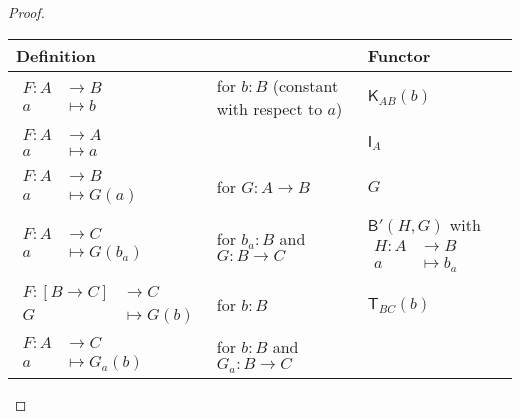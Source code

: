 \documentclass[a4paper]{article}
\theoremstyle{definition}
\theoremstyle{remark}
\newcommand{\nm}{\mathsf}
\newcommand{\combinator}{\nm}
\newcommand{\idFun}{\combinator{I}}
\newcommand{\revAppFun}{\combinator{T}}
\newcommand{\constFun}{\combinator{K}}
\newcommand{\compFun}{\combinator{B'}}
\begin{document}
\begin{proof}
  \begin{table}
    \centering
    \begin{tabular}{ll|l}
      Definition & & Functor\\
      \hline\hline
      \rule{0pt}{2em}
      $\begin{aligned}
        F : A &\to     B\\
            a &\mapsto b
      \end{aligned}$ &
      \parbox{3cm}{for $b : B$ (constant \\ with respect to $a$)} &
      $\constFun_{AB}(b)$\\
      \hline
      \rule{0pt}{2em}
      $\begin{aligned}
        F : A &\to     A\\
            a &\mapsto a
      \end{aligned}$ & &
      $\idFun_A$\\
      \hline
      \rule{0pt}{2em}
      $\begin{aligned}
        F : A &\to     B\\
            a &\mapsto G(a)
      \end{aligned}$ &
      for $G : A \to B$ &
      $G$\\
      \hline
      \rule{0pt}{2em}
      $\begin{aligned}
        F : A &\to     C\\
            a &\mapsto G(b_a)
      \end{aligned}$ &
      \parbox{3cm}{for $b_a : B$ \\ and $G : B \to C$} &
      $\compFun(H,G)$ with
      $\begin{aligned}
        H : A &\to     B\\
            a &\mapsto b_a
      \end{aligned}$\\
      \hline
      \rule{0pt}{2em}
      $\begin{aligned}
        F : [B \to C] &\to     C\\
            G         &\mapsto G(b)
      \end{aligned}$ &
      for $b : B$ &
      $\revAppFun_{BC}(b)$\\
      \hline
      \rule{0pt}{2em}
      $\begin{aligned}
        F : A &\to     C\\
            a &\mapsto G_a(b)
      \end{aligned}$ &
      \parbox{3cm}{for $b : B$ \\ and $G_a : B \to C$} &

\end{tabular}
\end{table}
\end{proof}
\end{document}
